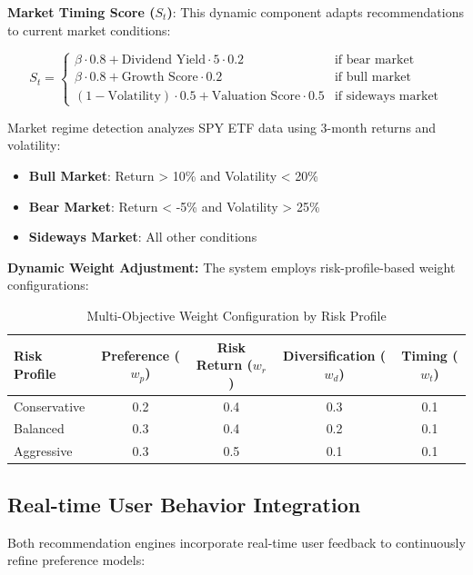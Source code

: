 \textbf{Market Timing Score ($S_t$)}:
This dynamic component adapts recommendations to current market conditions:

\begin{equation}
S_t = \begin{cases}
\beta \cdot 0.8 + \text{Dividend Yield} \cdot 5 \cdot 0.2 & \text{if bear market} \\
\beta \cdot 0.8 + \text{Growth Score} \cdot 0.2 & \text{if bull market} \\
(1 - \text{Volatility}) \cdot 0.5 + \text{Valuation Score} \cdot 0.5 & \text{if sideways market}
\end{cases}
\end{equation}

Market regime detection analyzes SPY ETF data using 3-month returns and volatility:
\begin{itemize}
\item \textbf{Bull Market}: Return > 10\% and Volatility < 20\%
\item \textbf{Bear Market}: Return < -5\% and Volatility > 25\%
\item \textbf{Sideways Market}: All other conditions
\end{itemize}

\textbf{Dynamic Weight Adjustment:}
The system employs risk-profile-based weight configurations:

\begin{table}[h]
\centering
\caption{Multi-Objective Weight Configuration by Risk Profile}
\begin{tabular}{|l|c|c|c|c|}
\hline
\textbf{Risk Profile} & \textbf{Preference ($w_p$)} & \textbf{Risk Return ($w_r$)} & \textbf{Diversification ($w_d$)} & \textbf{Timing ($w_t$)} \\
\hline
Conservative & 0.2 & 0.4 & 0.3 & 0.1 \\
Balanced & 0.3 & 0.4 & 0.2 & 0.1 \\
Aggressive & 0.3 & 0.5 & 0.1 & 0.1 \\
\hline
\end{tabular}
\end{table}

\subsection{Real-time User Behavior Integration}

Both recommendation engines incorporate real-time user feedback to continuously refine preference models:

